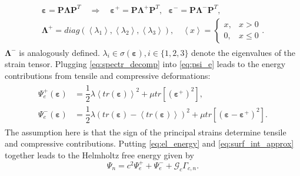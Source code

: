 \begin{align} \label{eq:spectr_decomp}
	\begin{aligned}
		\bm{\varepsilon} = \mathbf{P}\bm{\Lambda}\mathbf{P}^{T} \quad \Rightarrow \quad \bm{\varepsilon}^{+} = \mathbf{P}\bm{\Lambda}^{+}\mathbf{P}^{T}, \text{ } \bm{\varepsilon}^{-} = \mathbf{P}\bm{\Lambda}^{-}\mathbf{P}^{T}, \\
		\bm{\Lambda}^{+}=diag\left(\left<\lambda_{1}\right>,\left<\lambda_{2}\right>,\left<\lambda_{3}\right>\right), \quad \left<x\right>=\begin{cases}x, &x>0 \\ 0, & x\leq0\end{cases}.
	\end{aligned}
\end{align}
$\bm{\Lambda}^{-}$ is analogously                                                                                                                                                                                                                                                                                                                                                                                                                                                                                                          defined. $\lambda_{i}\in\sigma\left(\bm{\varepsilon}\right),i\in\{1,2,3\}$ denote the eigenvalues of the strain tensor. Plugging \eqref{eq:spectr_decomp} into \eqref{eq:psi_e} leads to the energy contributions from tensile and compressive deformations:
\begin{align} \label{eq:psi_e+-}
	\begin{aligned}
		\Psi_{e}^{+}\left(\bm{\varepsilon}\right) &= \dfrac{1}{2}\lambda\left<tr\left(\bm{\varepsilon}\right)\right>^{2}+\mu tr\left[\left(\bm{\varepsilon}^{+}\right)^{2}\right], \\
		\Psi_{e}^{-}\left(\bm{\varepsilon}\right) &= \dfrac{1}{2}\lambda\left(tr\left(\bm{\varepsilon}\right)-\left<tr\left(\bm{\varepsilon}\right)\right>\right)^{2}+\mu tr\left[\left(\bm{\varepsilon}-\bm{\varepsilon}^{+}\right)^{2}\right].
	\end{aligned}
\end{align}
The assumption here is that the sign of the principal strains determine tensile and compressive contributions. Putting \eqref{eq:el_energy} and \eqref{eq:surf_int_approx} together leads to the Helmholtz free energy given by
\begin{equation} \label{eq:Helmholtz}
	\Psi_{n}=c^{2}\Psi_{e}^{+}+\Psi_{e}^{-}+\mathcal{G}_{c}\Gamma_{c,n}.
\end{equation}

